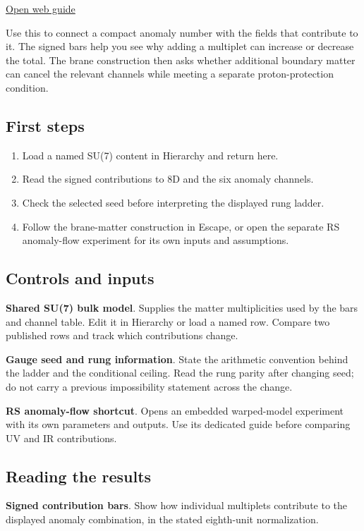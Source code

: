 \documentclass[11pt,a4paper]{article}
\begin{document}
\href{https://karlesmarin.github.io/ghu-explorer/guide/anomalies/index.html}{Open web guide}

Use this to connect a compact anomaly number with the fields that contribute to it. The signed bars help you see why adding a multiplet can increase or decrease the total. The brane construction then asks whether additional boundary matter can cancel the relevant channels while meeting a separate proton-protection condition.
\subsection*{First steps}
\begin{enumerate}
\item Load a named SU(7) content in Hierarchy and return here.
\item Read the signed contributions to 8D and the six anomaly channels.
\item Check the selected seed before interpreting the displayed rung ladder.
\item Follow the brane-matter construction in Escape, or open the separate RS anomaly-flow experiment for its own inputs and assumptions.
\end{enumerate}
\subsection*{Controls and inputs}
\textbf{Shared SU(7) bulk model}. Supplies the matter multiplicities used by the bars and channel table. Edit it in Hierarchy or load a named row. Compare two published rows and track which contributions change.

\textbf{Gauge seed and rung information}. State the arithmetic convention behind the ladder and the conditional ceiling. Read the rung parity after changing seed; do not carry a previous impossibility statement across the change.

\textbf{RS anomaly-flow shortcut}. Opens an embedded warped-model experiment with its own parameters and outputs. Use its dedicated guide before comparing UV and IR contributions.

\subsection*{Reading the results}
\textbf{Signed contribution bars}. Show how individual multiplets contribute to the displayed anomaly combination, in the stated eighth-unit normalization.
\end{document}
